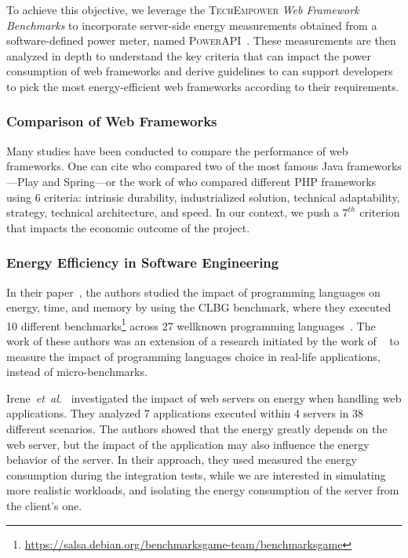 To achieve this objective, we leverage the \textsc{TechEmpower} \emph{Web Framework Benchmarks} to incorporate server-side energy measurements obtained from a software-defined power meter, named \textsc{PowerAPI}~\cite{fieni2020smartwatts}.
These measurements are then analyzed in depth to understand the key criteria that can impact the power consumption of web frameworks and derive guidelines to can support developers to pick the most energy-efficient web frameworks according to their requirements.

\subsubsection{Comparison of Web Frameworks}
Many studies have been conducted to compare the performance of web frameworks.
One can cite \cite{gajewski_analysis_2019} who compared two of the most famous Java frameworks---Play and Spring---or the work of \cite{benmoussa_new_2019} who compared different PHP frameworks using 6 criteria: intrinsic durability, industrialized solution, technical adaptability, strategy, technical architecture, and speed.
In our context, we push a $7^{th}$ criterion that impacts the economic outcome of the project.

\subsubsection{Energy Efficiency in Software Engineering}
In their paper~\cite{pereira_energy_2017}, the authors studied the impact of programming languages on energy, time, and memory by using the CLBG benchmark, where they executed 10 different benchmarks\footnote{\url{https://salsa.debian.org/benchmarksgame-team/benchmarksgame}} across 27 wellknown programming languages~\cite{noauthor_pypl_2018}.
The work of these authors was an extension of a research initiated by the work of \citeauthor{couto2017towards}~\cite{couto2017towards} to measure the impact of programming languages choice in real-life applications, instead of micro-benchmarks.

Irene~\emph{et~al.}~\cite{manotas_investigating_2013} investigated the impact of web servers on energy when handling web applications.
They analyzed 7 applications executed within 4 servers in 38 different scenarios.
The authors showed that the energy greatly depends on the web server, but the impact of the application may also influence the energy behavior of the server.
In their approach, they used measured the energy consumption during the integration tests, while we are interested in simulating more realistic workloads, and isolating the energy consumption of the server from the client's one.


